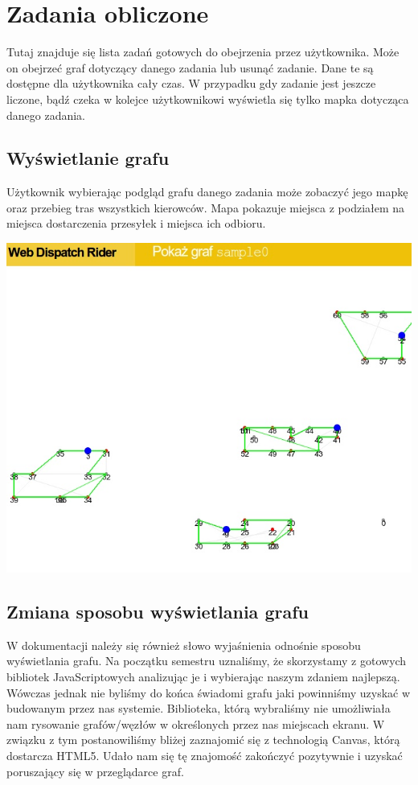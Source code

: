 \section{Zadania obliczone}
Tutaj znajduje się lista zadań gotowych do obejrzenia przez użytkownika. Może on obejrzeć graf dotyczący
danego zadania lub usunąć zadanie. Dane te są dostępne dla użytkownika cały czas. W przypadku gdy
zadanie jest jeszcze liczone, bądź czeka w kolejce użytkownikowi wyświetla się tylko mapka dotycząca danego zadania.

\subsection{Wyświetlanie grafu}
Użytkownik wybierając podgląd grafu danego zadania może zobaczyć jego mapkę oraz przebieg tras wszystkich kierowców.
Mapa pokazuje miejsca z podziałem na miejsca dostarczenia przesyłek i miejsca ich odbioru.
\newline

\begin{center}
\includegraphics[scale=0.5]{imgs/graf.jpg}
\end{center}

\subsection{Zmiana sposobu wyświetlania grafu}
W dokumentacji należy się również słowo wyjaśnienia odnośnie sposobu wyświetlania grafu.
Na początku semestru uznaliśmy, że skorzystamy z gotowych bibliotek JavaScriptowych analizując je
i wybierając naszym zdaniem najlepszą. Wówczas jednak nie byliśmy do końca świadomi grafu jaki powinniśmy
uzyskać w budowanym przez nas systemie. Biblioteka, którą wybraliśmy nie umożliwiała nam rysowanie grafów/węzłów
w określonych przez nas miejscach ekranu. W związku z tym postanowiliśmy bliżej zaznajomić się z technologią Canvas,
którą dostarcza HTML5. Udało nam się tę znajomość zakończyć pozytywnie i uzyskać poruszający się w przeglądarce graf.